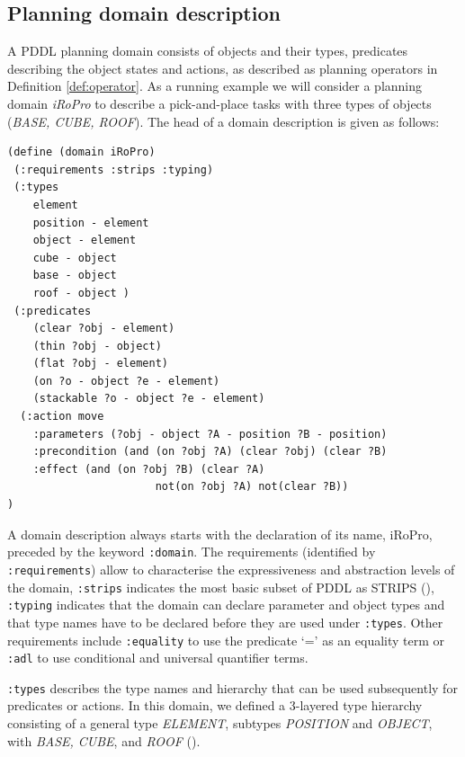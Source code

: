 \subsection{Planning domain description}\label{subsec:Planning domain description}
A PDDL planning domain consists of objects and their types, predicates describing the object states and actions, as described as planning operators in Definition \ref{def:operator}. 
As a running example we will consider a planning domain \textit{iRoPro} to describe a pick-and-place tasks with three types of objects (\textit{BASE, CUBE, ROOF}).
The head of a domain description is given as follows:
\begin{verbatim}
(define (domain iRoPro)
 (:requirements :strips :typing)
 (:types 
    element 
    position - element 
    object - element 
    cube - object 
    base - object 
    roof - object )
 (:predicates
    (clear ?obj - element)
    (thin ?obj - object)
    (flat ?obj - element)
    (on ?o - object ?e - element)
    (stackable ?o - object ?e - element) 
  (:action move
    :parameters (?obj - object ?A - position ?B - position)
    :precondition (and (on ?obj ?A) (clear ?obj) (clear ?B)
    :effect (and (on ?obj ?B) (clear ?A)
                       not(on ?obj ?A) not(clear ?B))
)
\end{verbatim}

A domain description always starts with the declaration of its name, \eg iRoPro, preceded by the keyword \texttt{:domain}.
The requirements (identified by \texttt{:requirements}) allow to characterise the expressiveness and abstraction levels of the domain, \eg
\texttt{:strips} indicates the most basic subset of PDDL as STRIPS (\cite{fikes1971strips}),
\texttt{:typing} indicates that the domain can declare parameter and object types and that type names have to be declared before they are used under \texttt{:types}.
Other requirements include \texttt{:equality} to use the predicate `=' as an equality term or \texttt{:adl} to use conditional and universal quantifier terms. 

\texttt{:types} describes the type names and hierarchy that can be used subsequently for predicates or actions.
In this domain, we defined a 3-layered type hierarchy consisting of a general type \textit{ELEMENT}, subtypes \textit{POSITION} and \textit{OBJECT}, with \textit{BASE, CUBE}, and \textit{ROOF} ().

